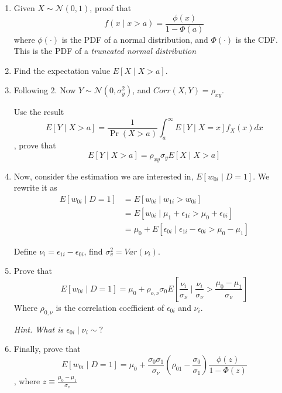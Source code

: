 \documentclass{article}
\begin{document}
    \begin{enumerate}
        \item Given $X \sim \mathcal{N}(0, 1)$, proof that 
        \begin{equation*}
            f(x \mid x > a) = \frac{\phi(x)}{1 - \Phi(a)}
        \end{equation*}
        where $\phi(\cdot)$ is the PDF of a normal distribution, and $\Phi(\cdot)$ is the CDF. 
        This is the PDF of a \emph{truncated normal distribution}
        
        \item Find the expectation value $E[X \mid X>a]$.
        \item Following 2. Now $Y \sim \mathcal{N}(0,\sigma_y^2)$, and $Corr(X,Y) = \rho_{xy}$.
        
        Use the result
        \begin{equation*}
            E[Y \mid X > a] = \frac{1}{\Pr(X>a)} \int_a^\infty E[Y \mid X=x] f_X(x) dx 
        \end{equation*},
        prove that 
        \begin{equation*}
            E[Y \mid X>a] = \rho_{xy} \sigma_y E[X \mid X>a]
        \end{equation*}
        \item Now, consider the estimation we are interested in, $E[w_{0i} \mid D=1]$. 
        We rewrite it as 
        \begin{align*}
            E[w_{0i} \mid D=1] &= E[w_{0i} \mid w_{1i} > w_{0i}] \\
            &= E[w_{0i} \mid \mu_1 + \epsilon_{1i} > \mu_0 + \epsilon_{0i}] \\
            &= \mu_0 + E[\epsilon_{0i} \mid \epsilon_{1i} - \epsilon_{0i} > \mu_0 - \mu_1]
        \end{align*}
        
        Define $\nu_i = \epsilon_{1i} - \epsilon_{0i}$, find $\sigma_v^2 = Var(\nu_i)$.
        \item Prove that 
        \begin{equation*}
            E[w_{0i} \mid D=1] = \mu_0 + \rho_{o,\nu}\sigma_0 E\left[\frac{\nu_i}{\sigma_\nu} \mid \frac{\nu_i}{\sigma_\nu} > \frac{\mu_0 - \mu_1}{\sigma_\nu}\right]
        \end{equation*}
        Where $\rho_{0,\nu}$ is the correlation coefficient of $\epsilon_{0i}$ and $\nu_i$. 
        
        \emph{Hint. What is $\epsilon_{0i} \mid \nu_i \sim ?$}
        \item Finally, prove that 
        \begin{equation*}
        E[w_{0i} \mid D=1] = \mu_0 + \frac{\sigma_0 \sigma_1}{\sigma_\nu}\left(\rho_{01} - \frac{\sigma_0}{\sigma_1}\right)\frac{\phi(z)}{1-\Phi(z)}
        \end{equation*}
        , where $z \equiv \frac{\mu_0 - \mu_1}{\sigma_v}$
    \end{enumerate}
\end{document}
